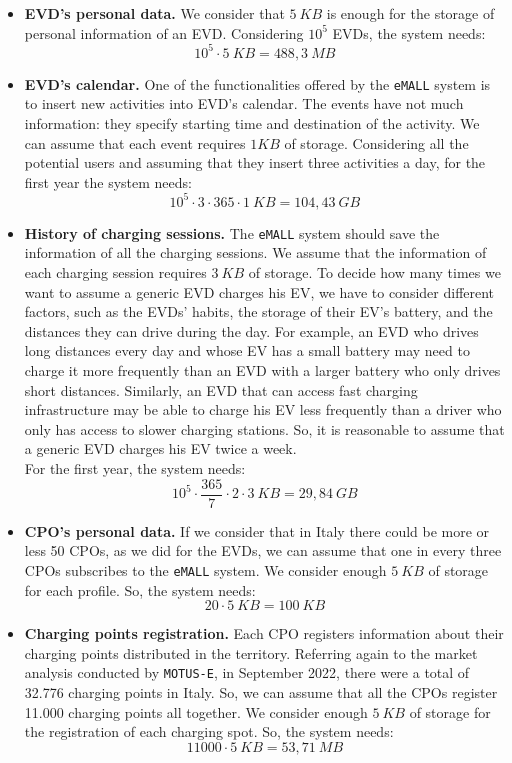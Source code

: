 \begin{itemize}
    \item \textbf{EVD's personal data.} We consider that $5\ KB$ is enough for the storage of personal information of an EVD\@.
    Considering $10^5$ EVDs, the system needs:
    \[
        10^5\cdot5\ KB = 488,3\ MB
    \]
    \item \textbf{EVD's calendar.} One of the functionalities offered by the \verb|eMALL| system is to insert new activities
    into EVD's calendar.
    The events have not much information: they specify starting time and destination of the activity.
    We can assume that each event requires $1 KB$ of storage.
    Considering all the potential users and assuming that they insert three activities a day, for the first year the system needs:
    \[
        10^5\cdot 3\cdot 365\cdot 1\ KB = 104,43\ GB
    \]
    \item \textbf{History of charging sessions.} The \verb|eMALL| system should save the information of all the charging sessions.
    We assume that the information of each charging session requires $3\ KB$ of storage.
    To decide how many times we want to assume a generic EVD charges his EV, we have to consider different factors,
    such as the EVDs' habits, the storage of their EV's battery, and the distances they can drive during the day.
    For example, an EVD who drives long distances every day and whose EV has a small battery may need to charge
    it more frequently than an EVD with a larger battery who only drives short distances.
    Similarly, an EVD that can access fast charging infrastructure may be able to charge his EV less frequently than
    a driver who only has access to slower charging stations.
    So, it is reasonable to assume that a generic EVD charges his EV twice a week. \\
    For the first year, the system needs:
    \[
        10^5\cdot \frac{365}{7} \cdot 2\cdot 3\ KB = 29,84\ GB
    \]
    \item \textbf{CPO's personal data.} If we consider that in Italy there could be more or less 50 CPOs,
    as we did for the EVDs, we can assume that one in every three CPOs subscribes to the \verb|eMALL| system.
    We consider enough $5\ KB$ of storage for each profile.
    So, the system needs:
    \[
        20\cdot 5\ KB = 100\ KB
    \]
    \item \textbf{Charging points registration.} Each CPO registers information about their charging points distributed in the territory.
    Referring again to the market analysis conducted by \verb|MOTUS-E|, in September 2022,
    there were a total of 32.776 charging points in Italy.
    So, we can assume that all the CPOs register 11.000 charging points all together.
    We consider enough $5\ KB$ of storage for the registration of each charging spot.
    So, the system needs:
    \[
        11 000\cdot 5\ KB = 53,71\ MB
    \]
\end{itemize}
